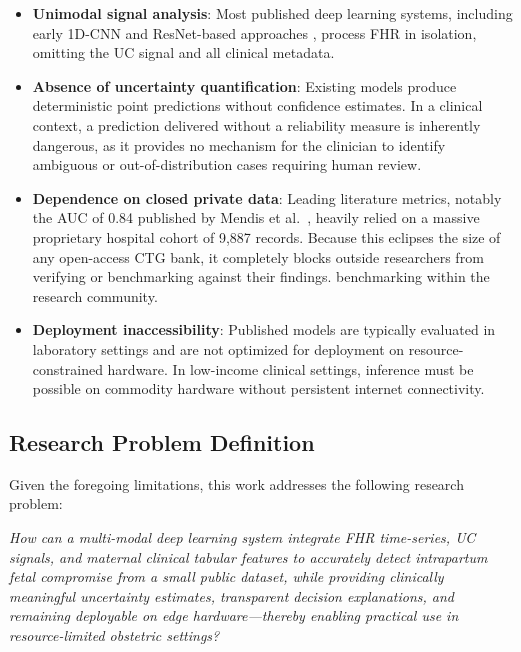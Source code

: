 \documentclass[conference]{IEEEtran}
\begin{document}
\begin{itemize}
    \item \textbf{Unimodal signal analysis}: Most published deep learning
    systems, including early 1D-CNN and ResNet-based approaches \cite{spilka2016,
    zhao2019}, process FHR in isolation, omitting the UC signal and all
    clinical metadata.

    \item \textbf{Absence of uncertainty quantification}: Existing models
    produce deterministic point predictions without confidence estimates.
    In a clinical context, a prediction delivered without a reliability
    measure is inherently dangerous, as it provides no mechanism for the
    clinician to identify ambiguous or out-of-distribution cases requiring
    human review.

    \item \textbf{Dependence on closed private data}: Leading literature metrics, notably the AUC of 0.84 published by Mendis et al.\ \cite{mendis2023}, heavily relied on a massive proprietary hospital cohort of 9,887 records. Because this eclipses the size of any open-access CTG bank, it completely blocks outside researchers from verifying or benchmarking against their findings.
    benchmarking within the research community.

    \item \textbf{Deployment inaccessibility}: Published models are typically
    evaluated in laboratory settings and are not optimized for deployment on
    resource-constrained hardware. In low-income clinical settings, inference
    must be possible on commodity hardware without persistent internet
    connectivity.
\end{itemize}

\subsection{Research Problem Definition}

Given the foregoing limitations, this work addresses the following
research problem:

\textit{How can a multi-modal deep learning system integrate FHR time-series,
UC signals, and maternal clinical tabular features to accurately detect
intrapartum fetal compromise from a small public dataset, while providing
clinically meaningful uncertainty estimates, transparent decision explanations,
and remaining deployable on edge hardware—thereby enabling practical use in
resource-limited obstetric settings?}
\end{document}
